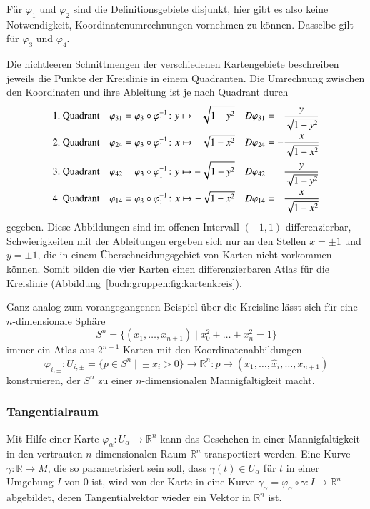 \begin{beispiel}
Für $\varphi_1$ und $\varphi_2$ sind die Definitionsgebiete disjunkt,
hier gibt es also keine Notwendigkeit, Koordinatenumrechnungen vornehmen
zu können.
Dasselbe gilt für $\varphi_3$ und $\varphi_4$.

Die nichtleeren Schnittmengen der verschiedenen Kartengebiete beschreiben
jeweils die Punkte der Kreislinie in einem Quadranten.
Die Umrechnung zwischen den Koordinaten und ihre Ableitung
ist je nach Quadrant durch
\begin{align*}
&\text{1.~Quadrant}&
\varphi_{31}
&=
\varphi_3\circ\varphi_1^{-1}\colon y\mapsto\phantom{-}\sqrt{1-y^2\mathstrut}
&
D\varphi_{31}
&=
-\frac{y}{\sqrt{1-y^2\mathstrut}}
\\
&\text{2.~Quadrant}&
\varphi_{24}
&=
\varphi_3\circ\varphi_1^{-1}\colon x\mapsto\phantom{-}\sqrt{1-x^2\mathstrut}
&
D\varphi_{24}
&=
-\frac{x}{\sqrt{1-x^2\mathstrut}}
\\
&\text{3.~Quadrant}&
\varphi_{42}
&=
\varphi_3\circ\varphi_1^{-1}\colon y\mapsto-\sqrt{1-y^2\mathstrut}
&
D\varphi_{42}
&=
\phantom{-}\frac{y}{\sqrt{1-y^2\mathstrut}}
\\
&\text{4.~Quadrant}&
\varphi_{14}
&=
\varphi_3\circ\varphi_1^{-1}\colon x\mapsto-\sqrt{1-x^2\mathstrut}
&
D\varphi_{14}
&=
\phantom{-}\frac{x}{\sqrt{1-x^2\mathstrut}}
\end{align*}
gegeben.
Diese Abbildungen sind im offenen Intervall $(-1,1)$ differenzierbar,
Schwierigkeiten mit der Ableitungen ergeben sich nur an den Stellen
$x=\pm1$ und $y=\pm 1$, die in einem Überschneidungsgebiet von Karten
nicht vorkommen können.
Somit bilden die vier Karten einen differenzierbaren Atlas für
die Kreislinie (Abbildung~\ref{buch:gruppen:fig:kartenkreis}).
\end{beispiel}

\begin{beispiel}
Ganz analog zum vorangegangenen Beispiel über die Kreisline lässt sich
für eine $n$-di\-men\-sio\-nale Sphäre
\[
S^n = \{ (x_1,\dots,x_{n+1})\;|\; x_0^2+\dots+x_n^2=1\}
\]
immer ein Atlas aus $2^{n+1}$ Karten mit den Koordinatenabbildungen
\[
\varphi_{i,\pm}
\colon
U_{i,\pm}
=
\{p\in S^n\;|\; \pm x_i >0\}
\to
\mathbb{R}^n
:
p\mapsto (x_1,\dots,\hat{x}_i,\dots,x_{n+1})
\]
konstruieren, der $S^n$ zu einer $n$-dimensionalen Mannigfaltigkeit macht.
\end{beispiel}

\subsubsection{Tangentialraum}
Mit Hilfe einer Karte $\varphi_\alpha\colon U_\alpha\to\mathbb{R}^n$
kann das Geschehen in einer Mannigfaltigkeit in den vertrauten 
$n$-dimensionalen Raum $\mathbb{R}^n$ transportiert werden. 
Eine Kurve $\gamma\colon \mathbb{R}\to M$, die so parametrisiert sein
soll, dass $\gamma(t)\in U_\alpha$ für $t$ in einer Umgebung $I$ von $0$ ist,
wird von der Karte in eine Kurve
$\gamma_\alpha=\varphi_\alpha\circ\gamma\colon I\to \mathbb{R}^n$ 
abgebildet,
deren Tangentialvektor wieder ein Vektor in $\mathbb{R}^n$ ist.

